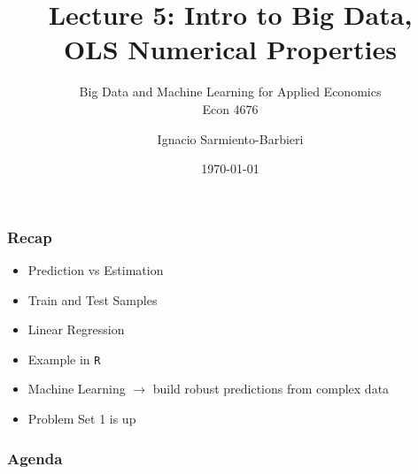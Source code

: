 \documentclass[
  shownotes,
  xcolor={svgnames},
  hyperref={colorlinks,citecolor=DarkBlue,linkcolor=DarkRed,urlcolor=DarkBlue}
  ]{beamer}
\begin{document}
\title[Lecture 5]{Lecture 5: Intro to Big Data, \\ OLS Numerical Properties}
\subtitle{Big Data and Machine Learning for Applied Economics \\ Econ 4676}
\date{\today}

\author[Sarmiento-Barbieri]{Ignacio Sarmiento-Barbieri}


\begin{frame}[noframenumbering]
\maketitle
\end{frame}



\begin{frame}
\frametitle{Recap}

\begin{itemize} 

    \item Prediction vs Estimation
    \bigskip
    \item Train and Test Samples
    \bigskip
    \item Linear Regression 
    \bigskip
    \item Example in \texttt{R}
    \bigskip
    \item Machine Learning $\rightarrow$ build robust predictions from complex data
    \bigskip
    \item Problem Set 1 is up
\end{itemize}
\end{frame}



\begin{frame}
\frametitle{Agenda}

\tableofcontents


\end{frame}

\end{document}
